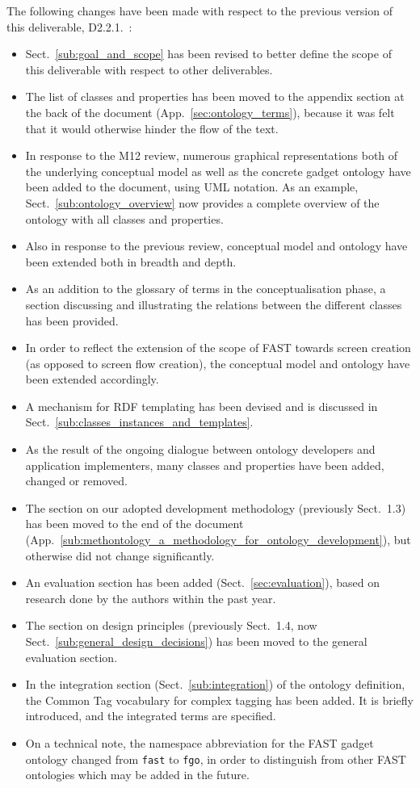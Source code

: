 \documentclass[twoside]{fast_latex}
\begin{document}
The following changes have been made with respect to the previous version of this deliverable, D2.2.1.~\cite{moeller2009fast_ontology}:

\begin{itemize}
	\item Sect.~\ref{sub:goal_and_scope} has been revised to better define the scope of this deliverable with respect to other deliverables.
	\item The list of classes and properties has been moved to the appendix section at the back of the document (App.~\ref{sec:ontology_terms}), because it was felt that it would otherwise hinder the flow of the text.
	\item In response to the M12 review, numerous graphical representations both of the underlying conceptual model as well as the concrete gadget ontology have been added to the document, using UML notation. As an example, Sect.~\ref{sub:ontology_overview} now provides a complete overview of the ontology with all classes and properties.
	\item Also in response to the previous review, conceptual model and ontology have been extended both in breadth and depth.
	\item As an addition to the glossary of terms in the conceptualisation phase, a section discussing and illustrating the relations between the different classes has been provided.
	\item In order to reflect the extension of the scope of FAST towards screen creation (as opposed to screen flow creation), the conceptual model and ontology have been extended accordingly.
	\item A mechanism for RDF templating has been devised and is discussed in Sect.~\ref{sub:classes_instances_and_templates}.
	\item As the result of the ongoing dialogue between ontology developers and application implementers, many classes and properties have been added, changed or removed.
	\item The section on our adopted development methodology (previously Sect.~1.3) has been moved to the end of the document (App.~\ref{sub:methontology_a_methodology_for_ontology_development}), but otherwise did not change significantly.
	\item An evaluation section has been added (Sect.~\ref{sec:evaluation}), based on research done by the authors within the past year.
	\item The section on design principles (previously Sect.~1.4, now Sect.~\ref{sub:general_design_decisions}) has been moved to the general evaluation section.
	\item In the integration section (Sect.~\ref{sub:integration}) of the ontology definition, the Common Tag vocabulary for complex tagging has been added. It is briefly introduced, and the integrated terms are specified.
	\item On a technical note, the namespace abbreviation for the FAST gadget ontology changed from \texttt{fast} to \texttt{fgo}, in order to distinguish from other FAST ontologies which may be added in the future.
\end{itemize}
\end{document}
